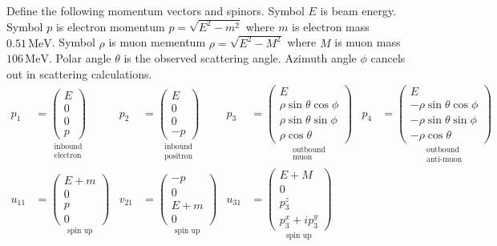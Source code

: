 \documentclass[12pt]{article}
\begin{document}
Define the following momentum vectors and spinors.
Symbol $E$ is beam energy.
Symbol $p$ is electron momentum $p=\sqrt{E^2-m^2}$ where $m$ is electron mass $0.51\,\text{MeV}$.
Symbol $\rho$ is muon mementum $\rho=\sqrt{E^2-M^2}$ where $M$ is muon mass $106\,\text{MeV}$.
Polar angle $\theta$ is the observed scattering angle.
Azimuth angle $\phi$ cancels out in scattering calculations.
\begin{align*}
p_1&=
\underset{\substack{\text{inbound}\\\text{electron}}}
{
\begin{pmatrix}E\\0\\0\\p\end{pmatrix}
}
&
p_2&=
\underset{\substack{\text{inbound}\\\text{positron}}}
{
\begin{pmatrix}E\\0\\0\\-p\end{pmatrix}
}
&
p_3&=
\underset{\substack{\text{outbound}\\\text{muon}}}
{
\begin{pmatrix}
E\\
\rho\sin\theta\cos\phi\\
\rho\sin\theta\sin\phi\\
\rho\cos\theta
\end{pmatrix}
}
&
p_4&=
\underset{\substack{\text{outbound}\\\text{anti-muon}}}
{
\begin{pmatrix}
E\\
-\rho\sin\theta\cos\phi\\
-\rho\sin\theta\sin\phi\\
-\rho\cos\theta
\end{pmatrix}
}
\\[1ex]
u_{11}&=
\underset{\text{spin up}}
{
\begin{pmatrix}E+m\\0\\p\\0\end{pmatrix}
}
&
v_{21}&=
\underset{\text{spin up}}
{
\begin{pmatrix}-p\\0\\E+m\\0\end{pmatrix}
}
&
u_{31}&=
\underset{\text{spin up}}
{
\begin{pmatrix}E+M\\0\\p_3^z\\p_3^x+ip_3^y\end{pmatrix}
}
\end{align*}
\end{document}
